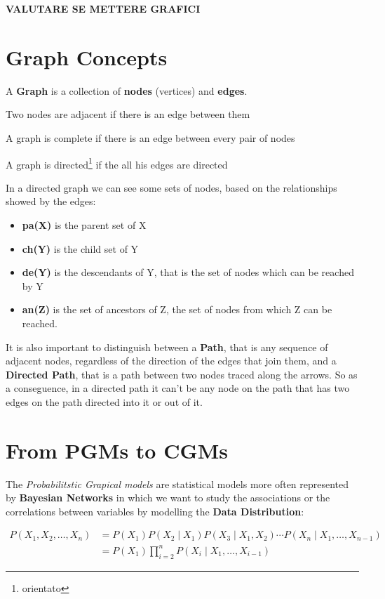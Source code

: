 \textbf{VALUTARE SE METTERE GRAFICI}


\section{Graph Concepts}
A \textbf{Graph} is a collection of \textbf{nodes} (vertices) and \textbf{edges}.
\begin{definition}
    Two nodes are adjacent if there is an edge between them    
\end{definition}
\begin{definition}
    A graph is complete if there is an edge between every pair of nodes   
\end{definition}
\begin{definition}
    A graph is directed\footnote{orientato} if the all his edges are directed   
\end{definition}
In a directed graph we can see some sets of nodes, based on the relationships showed by the edges:
\begin{itemize}
    \item \textbf{pa(X)} is the parent set of X
    \item \textbf{ch(Y)} is the child set of Y
    \item \textbf{de(Y)} is the descendants of Y, that is the set of nodes which can be reached by Y
    \item \textbf{an(Z)} is the set of ancestors of Z, the set of nodes from which Z can be reached.
\end{itemize}
It is also important to distinguish between a \textbf{Path}, that is any sequence of adjacent nodes, 
regardless of the direction of the edges that join them, and a \textbf{Directed Path}, that is a path
between two nodes traced along the arrows. So as a conseguence, in a directed path it can't be any node
on the path that has two edges on the path directed into it or out of it.
\newline
\section{From PGMs to CGMs}
The \textit{Probabilitstic Grapical models} are statistical models more often represented by 
\textbf{Bayesian Networks} in which we want to study the associations or the correlations between 
variables by modelling the \textbf{Data Distribution}:
\begin{definition}
    \begin{equation}
        \begin{aligned}
            P(X_1, X_2, \dots, X_n) &= P(X_1) P(X_2 \mid X_1) P(X_3 \mid X_1, X_2) \cdots P(X_n \mid X_1, \dots, X_{n-1}) \\
            &= P(X_1) \prod_{i=2}^{n} P(X_i \mid X_1, \dots, X_{i-1})
        \end{aligned}
    \end{equation}
\end{definition}
